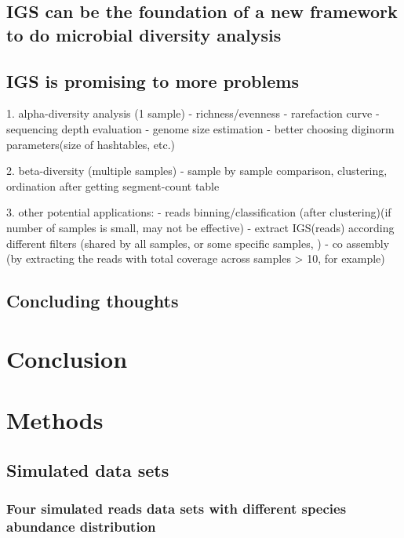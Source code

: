 \documentclass{article}
\begin{document}
\subsection{IGS can be the foundation of a new framework to do microbial diversity analysis}


\subsection{IGS is promising to more problems}

1. alpha-diversity analysis (1 sample)
    - richness/evenness
    - rarefaction curve
    - sequencing depth evaluation
    - genome size estimation
    - better choosing diginorm parameters(size of hashtables, etc.)

2. beta-diversity (multiple samples)
    - sample by sample comparison, clustering, ordination after getting segment-count table

3. other potential applications:
    - reads binning/classification (after clustering)(if number of samples is small, may not be effective)
    - extract IGS(reads) according different filters (shared by all samples, or some specific samples, )
    - co assembly (by extracting the reads with total coverage across samples > 10, for example)
    
    

\subsection{Concluding thoughts}



\section{Conclusion}

\section{Methods}

\subsection{Simulated data sets}

\subsubsection{Four simulated reads data sets with different species abundance distribution}
\end{document}
